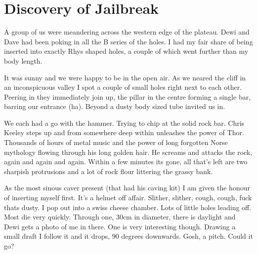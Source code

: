 \begin{marginfigure}
\end{marginfigure}

\section{Discovery of Jailbreak}
 
A group of us were meandering across the western edge of the plateau. Dewi and Dave had been poking in all the B series of the holes. I had my fair share of being inserted into exactly Rhys shaped holes, a couple of which went further than my body length.
 
It was sunny and we were happy to be in the open air. As we neared the cliff in an inconspicuous valley I spot a couple of small holes right next to each other. Peering in they immediately join up, the pillar in the centre forming a single bar, barring our entrance (ha). Beyond a dusty body sized tube invited us in. 

We each had a go with the hammer. Trying to chip at the solid rock bar. Chris Keeley steps up and from somewhere deep within unleashes the power of Thor. Thousands of hours of metal music and the power of long forgotten Norse mythology flowing through his long golden hair. He screams and attacks the rock, again and again and again. Within a few minutes its gone, all that’s left are two sharpish protrusions and a lot of rock flour littering the grassy bank. 
 
As the most sinous caver present (that had his caving kit) I am given the honour of inserting myself first. It’s a helmet off affair. Slither, slither, cough, cough, fuck thats dusty. I pop out into a swiss cheese chamber. Lots of little holes leading off. Most die very quickly. Through one, 30cm in diameter, there is daylight and Dewi gets a photo of me in there. One is very interesting though. Drawing a small draft I follow it and it drops, 90 degrees downwards. Gosh, a pitch. Could it go?
 
